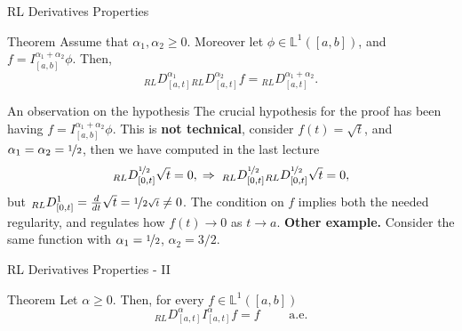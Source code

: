 \documentclass[aspectratio=169,xcolor=dvipsnames]{beamer}
\begin{document}
\begin{frame}{RL Derivatives Properties}
\begin{alertblock}{Theorem}
	Assume that $\alpha_1,\alpha_2 \geq 0$. Moreover let $\phi \in \mathbb{L}^{1}([a,b])$, and $f = I_{[a,b]}^{\alpha_1+\alpha_2} \phi$. Then,
	\[ {}_{RL}{D_{[a,t]}^{\alpha_1}} {}_{RL}{D_{[a,t]}^{\alpha_2}}f = {}_{RL}{D_{[a,t]}^{\alpha_1 + \alpha_2}}.    \]
\end{alertblock}

\begin{exampleblock}{An observation on the hypothesis}
The crucial hypothesis for the proof has been having  $f = I_{[a,b]}^{\alpha_1+\alpha_2} \phi$. This is \textbf{not technical}, consider $f(t) = \sqrt{t}$, and $\alpha_1 = \alpha_2 = \nicefrac{1}{2}$, then we have computed in the last lecture
\[
{}_{RL}{D_{[0,t]}^{\nicefrac{1}{2}}} \sqrt{t} = 0,\; \Rightarrow \; {}_{RL}{D_{[0,t]}^{\nicefrac{1}{2}}}{}_{RL}{D_{[0,t]}^{\nicefrac{1}{2}}} \sqrt{t}=0,
\]
but ${}_{RL}{D_{[0,t]}^{1}} = \frac{d}{dt} \sqrt{t} = \nicefrac{1}{2 \sqrt{t}} \neq 0$. The condition on $f$ implies both the needed regularity, and regulates how $f(t) \rightarrow 0$ as $t \rightarrow a$. \textbf{Other example.} Consider the same function with $\alpha_1 = \nicefrac{1}{2}$, $\alpha_2 = 3/2$.
\end{exampleblock}

\end{frame}

\begin{frame}{RL Derivatives Properties - II}
\begin{alertblock}{Theorem}
Let $\alpha \geq 0$. Then, for every $f \in \mathbb{L}^{1}([a,b])$
\[
{}_{RL}{D_{[a,t]}^{\alpha}} I_{[a,t]}^{\alpha} f = f \qquad \text{ a.e.}
\]
\end{alertblock}
\end{frame}
\end{document}
